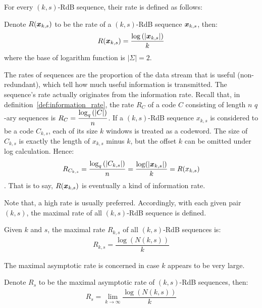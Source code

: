 For every $(k,s)$-RdB sequence, their rate is defined as follows:
\begin{definition}[Rate]
    Denote $R({\boldsymbol x}_{k,s})$ to be the rate of a $(k,s)$-RdB sequence ${\boldsymbol x}_{k,s}$, then:
    \begin{align}
        R({\boldsymbol x}_{k,s}) = \dfrac{\log\left(\left \lvert {\boldsymbol x}_{k,s} \right \rvert\right)}{k}
    \end{align}
    where the base of logarithm function is $\left\lvert\Sigma\right\rvert=2$.
\end{definition}

The rates of sequences are the proportion of the data stream that is useful (non-redundant), which tell how much useful information is transmitted. The sequence's rate actually originates from the information rate. Recall that, in definition~\ref{def:information_rate}, the rate $R_{C}$ of a code $C$ consisting of length $n$ $q$-ary sequences is $R_{C}=\dfrac{\log_{q}\left(\left \lvert C \right \rvert\right)}{n}$. If a $(k,s)$-RdB sequence $x_{k,s}$ is considered to be a code $C_{k,s}$, each of its size $k$ windows is treated as a codeword. The size of $C_{k,s}$ is exactly the length of $x_{k,s}$ minus $k$, but the offset $k$ can be omitted under log calculation. Hence: $$R_{C_{k,s}}= \dfrac{\log_{q}\left(\left \lvert C_{k,s} \right \rvert\right)}{n} = \dfrac{\log(\left \lvert {\boldsymbol x}_{k,s} \right \rvert)}{k} = R(x_{k,s})$$. That is to say, $R({\boldsymbol x}_{k,s})$ is eventually a kind of information rate.

Note that, a high rate is usually preferred. Accordingly, with each given pair $(k,s)$, the maximal rate of all $(k,s)$-RdB sequence is defined.
\begin{definition}
    Given $k$ and $s$, the maximal rate $R_{k,s}$ of all $(k,s)$-RdB sequences is:
    \begin{align}
        R_{k,s} = \dfrac{\log(N(k,s))}{k}
    \end{align}
\end{definition}


The maximal asymptotic rate is concerned in case $k$ appears to be very large.
\begin{definition}
    Denote $R_{s}$ to be the maximal asymptotic rate of $(k,s)$-RdB sequences, then:
    \begin{align}
        R_{s} = \lim_{k\to\infty}\dfrac{\log(N(k,s))}{k}
    \end{align}
\end{definition}

